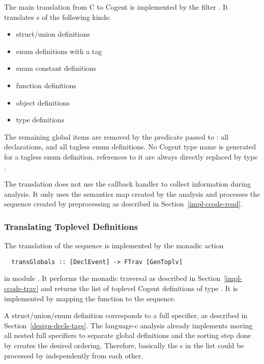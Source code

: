 The main translation from C to Cogent is implemented by the filter . It translates s
of the following kinds:
\begin{itemize}
\item struct/union definitions
\item enum definitions with a tag
\item enum constant definitions
\item function definitions
\item object definitions
\item type definitions
\end{itemize}
The remaining global items are removed by the predicate passed to : all declarations, 
and all tagless enum definitions. No Cogent type name is generated for a tagless enum definition,
references to it are always directly replaced by type .

The translation does not use the callback handler to collect information during analysis. It only uses the semantics map
created by the analysis and processes the  sequence created by preprocessing as described in 
Section~\ref{impl-ccode-read}.

\subsubsection{Translating Toplevel Definitions}

The translation of the  sequence is implemented by the monadic action
\begin{verbatim}
  transGlobals :: [DeclEvent] -> FTrav [GenToplv]
\end{verbatim}
in module .
It performs the monadic traversal as described in Section~\ref{impl-ccode-trav} and returns the list of toplevel
Cogent definitions of type . It is implemented by mapping the function  to the 
 sequence.

A struct/union/enum definition corresponds to a full specifier, as described in Section~\ref{design-decls-tags}.
The language-c analysis already implements moving all nested full specifiers to separate global definitions and the
sorting step done by  creates the desired ordering. Therefore, basically the 
s in the list could be processed by  independently from each other.

